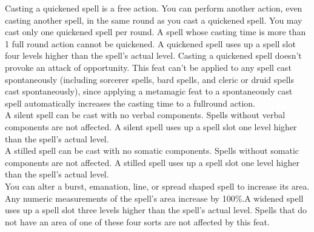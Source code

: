 \begin{multicols}{2}
{Casting a quickened spell is a free action. You can perform another action, even casting another spell, in the same round as you cast a quickened spell. You may cast only one quickened spell per round. A spell whose casting time is more than 1 full round action cannot be quickened. A quickened spell uses up a spell slot four levels higher than the spell's actual level. Casting a quickened spell doesn't provoke an attack of opportunity.
This feat can't be applied to any spell cast spontaneously (including sorcerer spells, bard spells, and cleric or druid spells cast spontaneously), since applying a metamagic feat to a spontaneously cast spell automatically increases the casting time to a full\textendash round action.}\\

{A silent spell can be cast with no verbal components. Spells without verbal components are not affected. A silent spell uses up a spell slot one level higher than the spell's actual level.
}\\

{A stilled spell can be cast with no somatic components.
Spells without somatic components are not affected. A stilled spell uses up a spell slot one level higher than the spell's actual level.}\\

{You can alter a burst, emanation, line, or spread shaped spell to increase its area. Any numeric measurements of the spell's area increase by 100\%.A widened spell uses up a spell slot three levels higher than the spell's actual level.
Spells that do not have an area of one of these four sorts are not affected by this feat.}\\

\end{multicols}